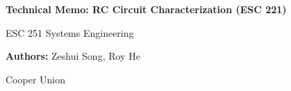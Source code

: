 \documentclass[12pt]{article}
\title{}
\date{}
\author{}
\begin{document}
\begin{titlepage}
    \centering
    \vspace*{1in}

    {\Large\bfseries Technical Memo: RC Circuit Characterization (ESC 221) \par}
    \vspace{1.5cm}

    {\large ESC 251 Systems Engineering\par}
    \vspace{2cm}

    {\large \textbf{Authors:} Zeshui Song, Roy He \par}
    \vspace{0.5cm}


    {\large Cooper Union \par}

    \vspace*{1in}
\end{titlepage}
\newpage
\end{document}
